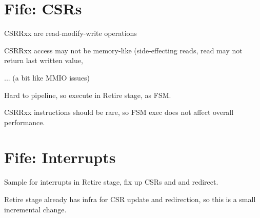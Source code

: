 
\section{Fife: CSRs}

\begin{tightlist}
\item CSRRxx are read-modify-write operations
\item CSRRxx access may not be memory-like (side-effecting reads, read
      may not return last written value,
\item ... (a bit like MMIO issues)
\end{tightlist}
Hard to pipeline, so execute in Retire stage, as FSM.

CSRRxx instructions should be rare, so FSM exec does not affect overall performance.


\section{Fife: Interrupts}

Sample for interrupts in Retire stage, fix up CSRs and and redirect.

Retire stage already has infra for CSR update and redirection, so this
is a small incremental change.

